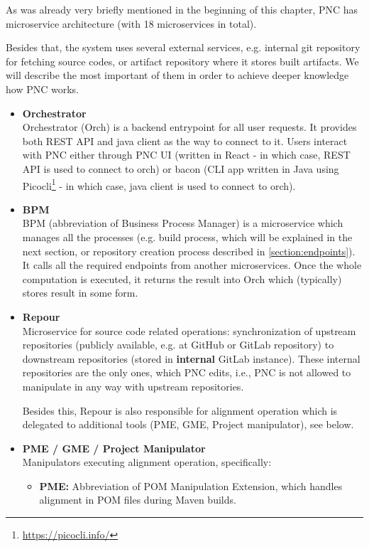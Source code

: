 \documentclass[../main.tex]{subfiles}
\begin{document}
As was already very briefly mentioned in the beginning of this chapter, PNC has microservice architecture (with 18 microservices in total).

Besides that, the system uses several external services, e.g. internal git repository for fetching source codes, or artifact repository where it stores built artifacts. We will describe the most important of them in order to achieve deeper knowledge how PNC works.

\begin{itemize}
    \item \textbf{Orchestrator}\\
    Orchestrator (Orch) is a backend entrypoint for all user requests. It provides both REST API and java client as the way to connect to it. Users interact with PNC either through PNC UI (written in React - in which case, REST API is used to connect to orch) or bacon (CLI app written in Java using Picocli\footnote{\url{https://picocli.info/}} - in which case, java client is used to connect to orch).

    \item \textbf{BPM}\\
    BPM (abbreviation of Business Process Manager) is a microservice which manages all the processes (e.g. build process, which will be explained in the next section, or repository creation process described in \ref{section:endpoints}). It calls all the required endpoints from another microservices. Once the whole computation is executed, it returns the result into Orch which (typically) stores result in some form.

    \item \textbf{Repour}\\
    Microservice for source code related operations: synchronization of upstream repositories (publicly available, e.g. at GitHub or GitLab repository) to downstream repositories (stored in \textbf{internal} GitLab instance). These internal repositories are the only ones, which PNC edits, i.e., PNC is not allowed to manipulate in any way with upstream repositories.
    
    Besides this, Repour is also responsible for alignment operation which is delegated to additional tools (PME, GME, Project manipulator), see below.

    \item \textbf{PME / GME / Project Manipulator}\\
    Manipulators executing alignment operation, specifically:
    \begin{itemize}
        \item \textbf{PME:} Abbreviation of POM Manipulation Extension, which handles alignment in POM files during Maven builds.


\end{itemize}
\end{itemize}
\end{document}
